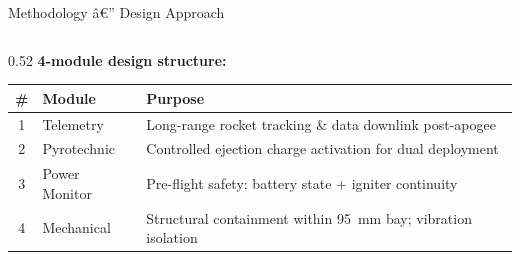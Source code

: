 \documentclass[aspectratio=169, 11pt]{beamer}
\begin{document}
\begin{frame}{Methodology â€” Design Approach}
\begin{columns}[T]
  \begin{column}{0.52\textwidth}
    \textbf{4-module design structure:}
    \vspace{0.3em}

    \begin{tabular}{@{}clp{3.6cm}@{}}
      \toprule
      \textbf{\#} & \textbf{Module} & \textbf{Purpose}\\
      \midrule
      1 & Telemetry     & Long-range rocket tracking \& data downlink post-apogee\\
      2 & Pyrotechnic   & Controlled ejection charge activation for dual deployment\\
      3 & Power Monitor & Pre-flight safety: battery state + igniter continuity\\
      4 & Mechanical    & Structural containment within 95~mm bay; vibration isolation\\
      \bottomrule
    \end{tabular}


\end{column}
\end{columns}
\end{frame}
\end{document}
